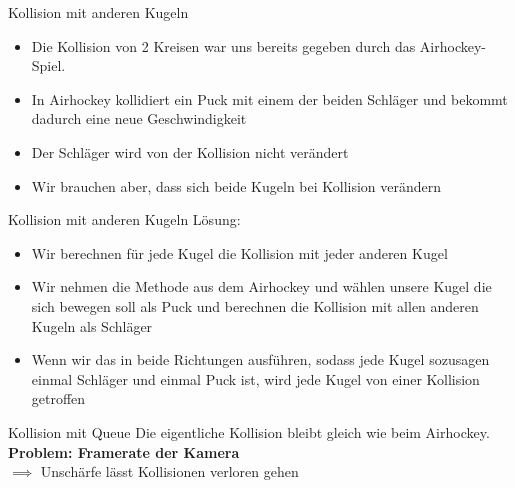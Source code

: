 \begin{frame}{Kollision mit anderen Kugeln}
\begin{itemize}
	\item Die Kollision von 2 Kreisen war uns bereits gegeben durch das Airhockey-Spiel.
	\item In Airhockey kollidiert ein Puck mit einem der beiden Schläger und bekommt dadurch eine neue Geschwindigkeit
	\item Der Schläger wird von der Kollision nicht verändert
	\item Wir brauchen aber, dass sich beide Kugeln bei Kollision verändern
\end{itemize}
\end{frame}
\begin{frame}{Kollision mit anderen Kugeln}
Lösung:
\begin{itemize}
	\item Wir berechnen für jede Kugel die Kollision mit jeder anderen Kugel
	\item Wir nehmen die Methode aus dem Airhockey und wählen unsere Kugel die sich bewegen soll als Puck und berechnen die Kollision mit allen anderen Kugeln als Schläger
	\item Wenn wir das in beide Richtungen ausführen, sodass jede Kugel sozusagen einmal Schläger und einmal Puck ist, wird jede Kugel von einer Kollision getroffen 
\end{itemize}
\end{frame}
\begin{frame}{Kollision mit Queue}
Die eigentliche Kollision bleibt gleich wie beim Airhockey. \\
\textbf{Problem: Framerate der Kamera} \\
$\implies$ Unschärfe lässt Kollisionen verloren gehen
\end{frame}